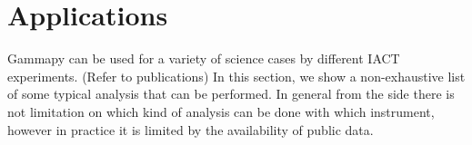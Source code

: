 \section{Applications}
\label{sec:applications}

Gammapy can be used for a variety of science cases by different IACT
experiments. (Refer to publications) In this section, we show a non-exhaustive
list of some typical analysis that can be performed. In general from the
\gammapy side there is not limitation on which kind of analysis can be done
with which instrument, however in practice it is limited by the availability of
public data.







